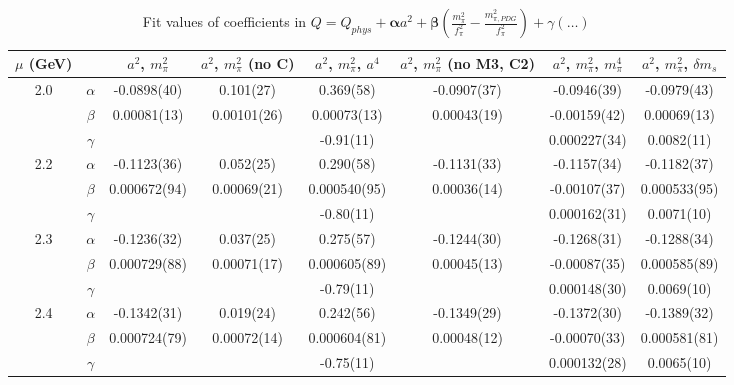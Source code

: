 \documentclass[12pt]{extarticle}
\begin{document}
\begin{table}[h!]
\begin{center}
\begin{tabular}{|c c|c|c|c|c|c|c|}
\hline
$\mu$ (GeV) &  & $a^2$, $m_\pi^2$& $a^2$, $m_\pi^2$ (no C)& $a^2$, $m_\pi^2$, $a^4$& $a^2$, $m_\pi^2$ (no M3, C2)& $a^2$, $m_\pi^2$, $m_\pi^4$& $a^2$, $m_\pi^2$, $\delta m_s$\\
\hline
\multirow{3}{0.5in}{2.0} & $\alpha$ & -0.0898(40)& 0.101(27)& 0.369(58)& -0.0907(37)& -0.0946(39)& -0.0979(43)\\
 & $\beta$ & 0.00081(13)& 0.00101(26)& 0.00073(13)& 0.00043(19)& -0.00159(42)& 0.00069(13)\\
 & $\gamma$ &  &  & -0.91(11)&  & 0.000227(34)& 0.0082(11)\\
\hline
\multirow{3}{0.5in}{2.2} & $\alpha$ & -0.1123(36)& 0.052(25)& 0.290(58)& -0.1131(33)& -0.1157(34)& -0.1182(37)\\
 & $\beta$ & 0.000672(94)& 0.00069(21)& 0.000540(95)& 0.00036(14)& -0.00107(37)& 0.000533(95)\\
 & $\gamma$ &  &  & -0.80(11)&  & 0.000162(31)& 0.0071(10)\\
\hline
\multirow{3}{0.5in}{2.3} & $\alpha$ & -0.1236(32)& 0.037(25)& 0.275(57)& -0.1244(30)& -0.1268(31)& -0.1288(34)\\
 & $\beta$ & 0.000729(88)& 0.00071(17)& 0.000605(89)& 0.00045(13)& -0.00087(35)& 0.000585(89)\\
 & $\gamma$ &  &  & -0.79(11)&  & 0.000148(30)& 0.0069(10)\\
\hline
\multirow{3}{0.5in}{2.4} & $\alpha$ & -0.1342(31)& 0.019(24)& 0.242(56)& -0.1349(29)& -0.1372(30)& -0.1389(32)\\
 & $\beta$ & 0.000724(79)& 0.00072(14)& 0.000604(81)& 0.00048(12)& -0.00070(33)& 0.000581(81)\\
 & $\gamma$ &  &  & -0.75(11)&  & 0.000132(28)& 0.0065(10)\\
\hline
\end{tabular}
\caption{Fit values of coefficients in $Q = Q_{phys} + \mathbf{\alpha} a^2 + \mathbf{\beta}\left(\frac{m_\pi^2}{f_\pi^2}-\frac{m_{\pi,PDG}^2}{f_\pi^2}\right) + \gamma(\ldots)$}
\end{center}
\end{table}





\end{document}
